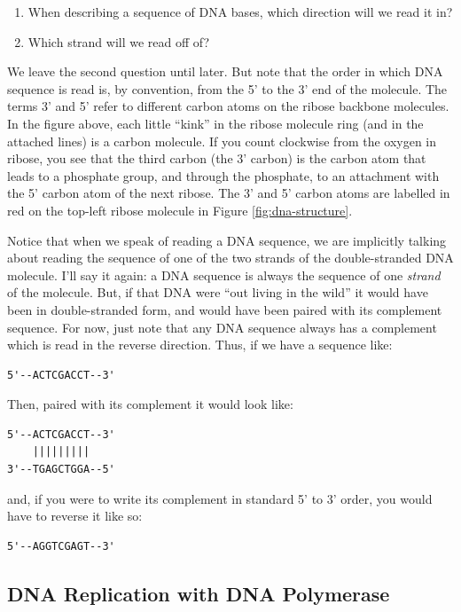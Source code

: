 \documentclass[]{krantz}
\providecommand{\tightlist}{%
  \setlength{\itemsep}{0pt}\setlength{\parskip}{0pt}}
\begin{document}
\begin{enumerate}
\def\labelenumi{\arabic{enumi}.}
\tightlist
\item
  When describing a sequence of DNA bases, which direction will we read it in?
\item
  Which strand will we read off of?
\end{enumerate}

We leave the second question until later. But note that the order in which DNA sequence
is read is, by convention, from the 5' to the 3' end of the molecule. The terms 3' and 5'
refer to different carbon atoms on the ribose backbone molecules. In the figure above,
each little ``kink'' in the ribose molecule ring (and in the attached lines) is a carbon molecule.
If you count clockwise from the oxygen in ribose, you see that the third carbon (the 3' carbon) is the
carbon atom that leads to a phosphate group, and through the phosphate, to an attachment with the
5' carbon atom of the next ribose. The 3' and 5' carbon atoms are labelled in red
on the top-left ribose molecule in Figure \ref{fig:dna-structure}.

Notice that when we speak of reading a DNA sequence, we are implicitly talking about
reading the sequence of one of the two strands of the double-stranded DNA molecule.
I'll say it again: a DNA sequence is always the sequence of one \emph{strand} of the molecule.
But, if that DNA were ``out living in the wild'' it would have been in double-stranded
form, and would have been paired with its complement sequence. For now, just note
that any DNA sequence always has a complement which is read in the reverse direction.
Thus, if we have a sequence like:

\begin{verbatim}
5'--ACTCGACCT--3'
\end{verbatim}

Then, paired with its complement it would look like:

\begin{verbatim}
5'--ACTCGACCT--3'
    |||||||||
3'--TGAGCTGGA--5'
\end{verbatim}

and, if you were to write its complement in standard 5' to 3' order,
you would have to reverse it like so:

\begin{verbatim}
5'--AGGTCGAGT--3'
\end{verbatim}

\hypertarget{dna-replication-with-dna-polymerase}{%
\subsection{DNA Replication with DNA Polymerase}\label{dna-replication-with-dna-polymerase}}
\end{document}
